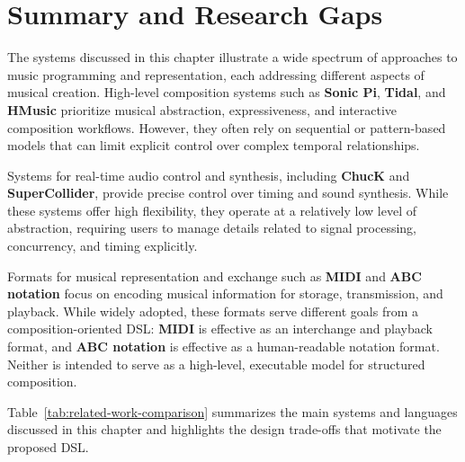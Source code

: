 \section{Summary and Research Gaps}\label{sec:summary-and-research-gaps}

The systems discussed in this chapter illustrate a wide spectrum of approaches to music programming and representation,
each addressing different aspects of musical creation.
High-level composition systems such as \textbf{Sonic Pi}, \textbf{Tidal}, and \textbf{HMusic} prioritize musical
abstraction, expressiveness, and interactive composition workflows.
However, they often rely on sequential or pattern-based models that can limit explicit control over complex temporal
relationships.

Systems for real-time audio control and synthesis, including \textbf{ChucK} and \textbf{SuperCollider}, provide precise
control over timing and sound synthesis.
While these systems offer high flexibility, they operate at a relatively low level of abstraction, requiring users to
manage details related to signal processing, concurrency, and timing explicitly.

Formats for musical representation and exchange such as \textbf{MIDI} and \textbf{ABC notation} focus on encoding
musical information for storage, transmission, and playback\@.
While widely adopted, these formats serve different goals from a composition-oriented DSL\@: \textbf{MIDI} is effective
as an interchange and playback format, and \textbf{ABC notation} is effective as a human-readable notation format.
Neither is intended to serve as a high-level, executable model for structured composition.

Table~\ref{tab:related-work-comparison} summarizes the main systems and languages discussed in this chapter and
highlights the design trade-offs that motivate the proposed DSL\@.


